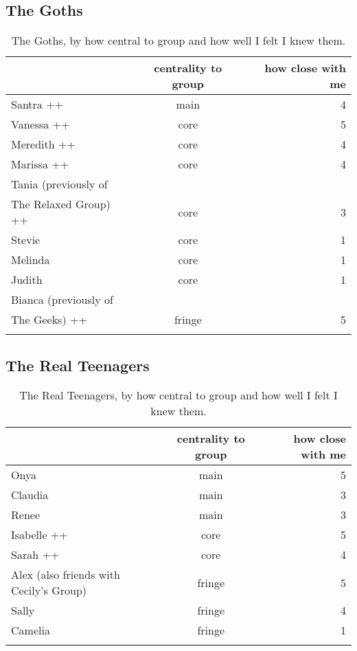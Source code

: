 \subsection{The Goths}
\nopagebreak
\begin{table}[ht]
\caption{The Goths, by how central to group and how well I felt I knew them.}\label{append:Goths}
	\centering
		\begin{tabular}{p{4cm}cr} \\
		\lsptoprule
			\multirow{2}{*}{\sc name} & \multicolumn{1}{p{2cm}}{\centering \sc centrality to group} & \multicolumn{1}{p{1.75cm}}{\centering \sc how close with me}  \\
		\midrule
Santra ++ & main & 4 \\\hline
Vanessa ++ & core & 5 \\\hline
Meredith ++ & core & 4 \\\hline
Marissa ++ & core & 4 \\\hline
Tania (previously of\\The Relaxed Group) ++ & core & 3 \\\hline
Stevie & core & 1 \\\hline
Melinda & core & 1 \\\hline
Judith & core & 1 \\\hline
Bianca (previously of\\The Geeks) ++ & fringe & 5 \\
   \lspbottomrule
	\end{tabular}
\end{table}

\pagebreak
\subsection{The Real Teenagers}
\nopagebreak
\begin{table}[H]
\caption{The Real Teenagers, by how central to group and how well I felt I knew them.}\label{append:RealTeens}
	\centering
		\begin{tabular}{p{4cm}cr} \\
		\lsptoprule
			\multirow{2}{*}{\sc name} & \multicolumn{1}{p{2cm}}{\centering \sc centrality to group} & \multicolumn{1}{p{1.75cm}}{\centering \sc how close with me}  \\
		\midrule
Onya & main & 5 \\\hline
Claudia & main & 3 \\\hline
Renee & main & 3 \\\hline
Isabelle ++ & core & 5 \\\hline
Sarah ++ & core & 4 \\\hline
Alex (also friends with Cecily's Group) & fringe & 5 \\\hline
Sally & fringe & 4 \\\hline
Camelia & fringe & 1 \\
   \lspbottomrule
				\end{tabular}
\end{table}


